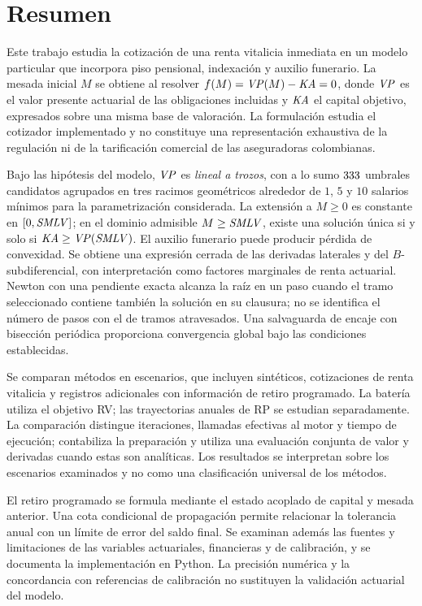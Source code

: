 \chapter*{Resumen}

\begin{singlespace}
Este trabajo estudia la cotización de una renta vitalicia inmediata en un modelo
particular que incorpora piso pensional, indexación y auxilio funerario. La mesada
inicial $M$ se obtiene al resolver $f(M)=\mathit{VP}(M)-\mathit{KA}=0$, donde $\mathit{VP}$ es el valor
presente actuarial de las obligaciones incluidas y $\mathit{KA}$ el capital objetivo,
expresados sobre una misma base de valoración. La formulación estudia el cotizador
implementado y no constituye una representación exhaustiva de la regulación ni de
la tarificación comercial de las aseguradoras colombianas.

Bajo las hipótesis del modelo, $\mathit{VP}$ es \emph{lineal a trozos}, con a lo sumo
$333$ umbrales candidatos agrupados en tres racimos geométricos
alrededor de $1$, $5$ y $10$ salarios mínimos para la parametrización considerada.
La extensión a $M\ge0$ es constante en $[0,\mathit{SMLV}]$; en el dominio admisible
$M\ge\mathit{SMLV}$, existe una solución única si y solo si $\mathit{KA}\ge\mathit{VP}(\mathit{SMLV})$.
El auxilio funerario puede producir pérdida de convexidad. Se obtiene una
expresión cerrada de las derivadas laterales y del $B$\nobreakdash-subdiferencial,
con interpretación como factores marginales de renta actuarial. Newton con una
pendiente exacta alcanza la raíz en un paso cuando el tramo seleccionado contiene
también la solución en su clausura; no se identifica el número de pasos con el de
tramos atravesados. Una salvaguarda de encaje con bisección periódica proporciona
convergencia global bajo las condiciones establecidas.

Se comparan \datoNMetodos{} métodos en \datoNEscenarios{} escenarios, que incluyen
\datoNSinteticos{} sintéticos, \datoNReales{} cotizaciones de renta vitalicia y
\datoNRealesRP{} registros adicionales con información de retiro programado.
La batería utiliza el objetivo RV; las trayectorias anuales de RP se estudian
separadamente. La comparación distingue
iteraciones, llamadas efectivas al motor y tiempo de ejecución; contabiliza la
preparación y utiliza una evaluación conjunta de valor y derivadas cuando estas
son analíticas. Los resultados se interpretan sobre los escenarios examinados y
no como una clasificación universal de los métodos.

El retiro programado se formula mediante el estado acoplado de capital y mesada
anterior. Una cota condicional de propagación permite relacionar la tolerancia
anual con un límite de error del saldo final. Se examinan además las fuentes y
limitaciones de las variables actuariales, financieras y de calibración, y se
documenta la implementación en Python. La precisión numérica y la concordancia
con referencias de calibración no sustituyen la validación actuarial del modelo.
\end{singlespace}

